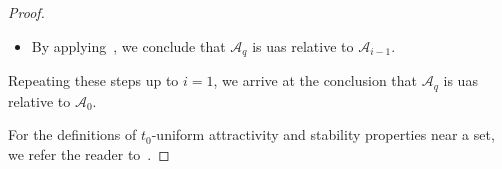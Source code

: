 \documentclass[../main.tex]{subfiles}
\begin{document}
\begin{proof}
\begin{itemize}
\begin{itemize}
        \item[3b)] By applying~\cite[Theorem 18]{Maggiore2023}, we conclude that $\mathcal{A}_q$ is \gls{uas} relative to $\mathcal{A}_{i-1}$.
    \end{itemize}
    Repeating these steps up to $i=1$, we arrive at the conclusion that $\mathcal{A}_q$ is \gls{uas} relative to $\mathcal{A}_0$.
\end{itemize}\vspace{-3pt}
For the definitions of $t_0$-uniform attractivity and stability properties near a set, we refer the reader to~\citep{Maggiore2023}.


\vspace{-7pt}

\end{proof}
\end{document}
